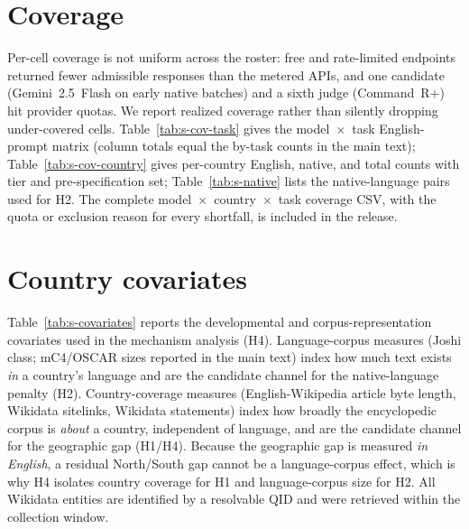 \documentclass[11pt,a4paper]{article}
\begin{document}
\section{Coverage}

Per-cell coverage is not uniform across the roster: free and rate-limited
endpoints returned fewer admissible responses than the metered APIs, and one
candidate (Gemini~2.5~Flash on early native batches) and a sixth judge
(Command~R+) hit provider quotas. We report realized coverage rather than
silently dropping under-covered cells. Table~\ref{tab:s-cov-task} gives the
model~$\times$~task English-prompt matrix (column totals equal the by-task counts
in the main text); Table~\ref{tab:s-cov-country} gives per-country English,
native, and total counts with tier and pre-specification set; Table~\ref{tab:s-native}
lists the native-language pairs used for H2. The complete
model~$\times$~country~$\times$~task coverage CSV, with the quota or exclusion
reason for every shortfall, is included in the release.





\section{Country covariates}

Table~\ref{tab:s-covariates} reports the developmental and corpus-representation
covariates used in the mechanism analysis (H4). Language-corpus measures
(Joshi class; mC4/OSCAR sizes reported in the main text) index how much text
exists \emph{in} a country's language and are the candidate channel for the
native-language penalty (H2). Country-coverage measures (English-Wikipedia
article byte length, Wikidata sitelinks, Wikidata statements) index how broadly
the encyclopedic corpus is \emph{about} a country, independent of language, and
are the candidate channel for the geographic gap (H1/H4). Because the geographic
gap is measured \emph{in English}, a residual North/South gap cannot be a
language-corpus effect, which is why H4 isolates country coverage for H1 and
language-corpus size for H2. All Wikidata entities are identified by a resolvable
QID and were retrieved within the collection window.
\end{document}
